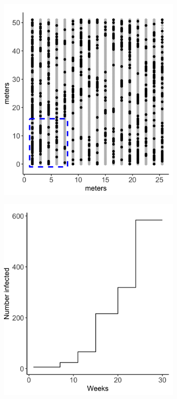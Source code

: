 \documentclass{uwstat572}
\begin{document}
\begin{figure}[h]
	\centering
	\begin{subfigure}[b]{0.49\textwidth}
		\includegraphics[width=\textwidth]{figures/figure_1a.png}
		\caption{}
		\label{fig:plants}
	\end{subfigure}
	\hfill
	\begin{subfigure}[b]{0.49\textwidth}
		\includegraphics[width=\textwidth]{figures/figure_1b.png}

\end{subfigure}
\end{figure}
\end{document}
